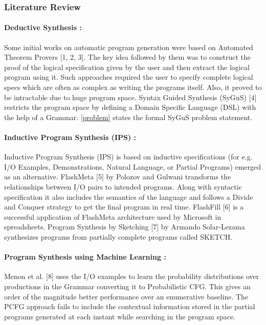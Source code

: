 \subsubsection{Literature Review}
\paragraph{Deductive Synthesis :}
Some initial works on automatic program generation were based on Automated Theorem Provers [1, 2, 3]. The key idea followed by them was to construct the proof of the logical specification given by the user and then extract the logical program using it. Such approaches required the user to specify complete logical specs which are often as complex as writing the programs itself. Also, it proved to be intractable due to huge program space. Syntax Guided Synthesis (SyGuS) [4] restricts the program space by defining a Domain Specific Language (DSL) with the help of a Grammar. \ref{problem} states the formal SyGuS problem statement.

\paragraph{Inductive Program Synthesis (IPS) :}
Inductive Program Synthesis (IPS) is based on inductive specifications (for e.g. I/O Examples, Demonstrations, Natural Language, or Partial Programs) emerged as an alternative. FlashMeta [5] by Polozov and Gulwani transforms the relationships between I/O pairs to intended programs. Along with syntactic specification it also includes the semantics of the language and follows a Divide and Conquer strategy to get the final program in real time. FlashFill [6] is a successful application of FlashMeta architecture used by Microsoft in spreadsheets. Program Synthesis by Sketching [7] by Armando Solar-Lezama synthesizes programs from partially complete programs called SKETCH. 

\paragraph{Program Synthesis using Machine Learning :}
Menon et al. [8] uses the I/O examples to learn the probability distributions over productions in the Grammar converting it to Probabilistic CFG. This gives an order of the magnitude better performance over an enumerative baseline.  The PCFG approach fails to include the contextual information stored in the partial programs generated at each instant while searching in the program space. 

